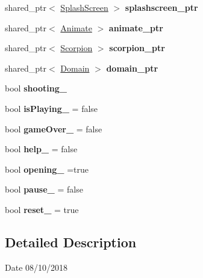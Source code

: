 \begin{DoxyCompactItemize}
shared\+\_\+ptr$<$ \mbox{\hyperlink{class_splash_screen}{Splash\+Screen}} $>$ {\bfseries splashscreen\+\_\+ptr}
\item 
\mbox{\label{class_game_loop_a88c8984ac6b5cd3c641ea0d6b303ac53}} 
shared\+\_\+ptr$<$ \mbox{\hyperlink{class_animate}{Animate}} $>$ {\bfseries animate\+\_\+ptr}
\item 
\mbox{\label{class_game_loop_a2a4fb370685af0c12ecd94f7e0d04e88}} 
shared\+\_\+ptr$<$ \mbox{\hyperlink{class_scorpion}{Scorpion}} $>$ {\bfseries scorpion\+\_\+ptr}
\item 
\mbox{\label{class_game_loop_a32ddc90b0c34d3902e2b2cc70226509b}} 
shared\+\_\+ptr$<$ \mbox{\hyperlink{class_domain}{Domain}} $>$ {\bfseries domain\+\_\+ptr}
\item 
\mbox{\label{class_game_loop_aae583c2abb2f104e742ddb8e278ddeee}} 
bool {\bfseries shooting\+\_\+}
\item 
\mbox{\label{class_game_loop_ab8c60e59382a9beec33e31a902bba520}} 
bool {\bfseries is\+Playing\+\_\+} = false
\item 
\mbox{\label{class_game_loop_ad02a1c45b3bff989b62a6ec06060338a}} 
bool {\bfseries game\+Over\+\_\+} = false
\item 
\mbox{\label{class_game_loop_a7109ce9428e30f60f42b38d838af63f6}} 
bool {\bfseries help\+\_\+} = false
\item 
\mbox{\label{class_game_loop_ade05dc8cc3f5e46d18319e399f64ed39}} 
bool {\bfseries opening\+\_\+} =true
\item 
\mbox{\label{class_game_loop_a32dcf69311fb136ba9bdd1a804545b15}} 
bool {\bfseries pause\+\_\+} = false
\item 
\mbox{\label{class_game_loop_aa0ef783e1f12b400d4460062765c9226}} 
bool {\bfseries reset\+\_\+} = true
\end{DoxyCompactItemize}


\subsection{Detailed Description}
\begin{DoxyDate}{Date}
08/10/2018 
\end{DoxyDate}


